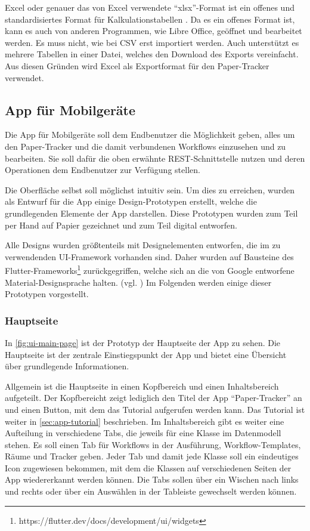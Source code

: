 Excel oder genauer das von Excel verwendete \enquote{xlsx}-Format ist ein offenes und standardisiertes Format
für Kalkulationstabellen \cite{iso29500}.
Da es ein offenes Format ist, kann es auch von anderen Programmen, wie Libre Office, geöffnet und bearbeitet werden.
Es muss nicht, wie bei \gls{CSV} erst importiert werden.
Auch unterstützt es mehrere Tabellen in einer Datei, welches den Download des Exports vereinfacht.
Aus diesen Gründen wird Excel als Exportformat für den Paper-Tracker verwendet.

\FloatBarrier
\subsection{App für Mobilgeräte} \label{sec:app}

Die App für Mobilgeräte soll dem Endbenutzer die Möglichkeit geben, alles um den Paper-Tracker und die damit verbundenen Workflows einzusehen und zu bearbeiten.
Sie soll dafür die oben erwähnte \gls{REST}-Schnittstelle nutzen und deren Operationen dem Endbenutzer zur Verfügung stellen.

Die Oberfläche selbst soll möglichst intuitiv sein.
Um dies zu erreichen, wurden als Entwurf für die App einige Design-Prototypen erstellt, welche die grundlegenden Elemente der App darstellen.
Diese Prototypen wurden zum Teil per Hand auf Papier gezeichnet und zum Teil digital entworfen.

Alle Designs wurden größtenteils mit Designelementen entworfen, die im zu verwendenden \gls{UI}-Framework vorhanden sind.
Daher wurden auf Bausteine des
Flutter-Frameworks\footnote{https://flutter.dev/docs/development/ui/widgets} zurückgegriffen, welche
sich an die von Google entworfene Material-Designsprache halten. (vgl. \cite{Google2020})
Im Folgenden werden einige dieser Prototypen vorgestellt.

\FloatBarrier
\subsubsection{Hauptseite}

In \autoref{fig:ui-main-page} ist der Prototyp der Hauptseite der App zu sehen.
Die Hauptseite ist der zentrale Einstiegspunkt der App und bietet eine Übersicht über grundlegende
Informationen.

Allgemein ist die Hauptseite in einen Kopfbereich und einen Inhaltsbereich aufgeteilt.
Der Kopfbereicht zeigt lediglich den Titel der App \enquote{Paper-Tracker} an und einen Button, mit dem das Tutorial aufgerufen werden kann.
Das Tutorial ist weiter in \autoref{sec:app-tutorial} beschrieben.
Im Inhaltsbereich gibt es weiter eine Aufteilung in verschiedene Tabs, die jeweils für eine Klasse im Datenmodell stehen.
Es soll einen Tab für Workflows in der Ausführung, Workflow-Templates, Räume und Tracker geben.
Jeder Tab und damit jede Klasse soll ein eindeutiges Icon zugewiesen bekommen, mit dem die Klassen auf verschiedenen Seiten der App wiedererkannt werden können.
Die Tabs sollen über ein Wischen nach links und rechts oder über ein Auswählen in der Tableiste gewechselt werden können.

